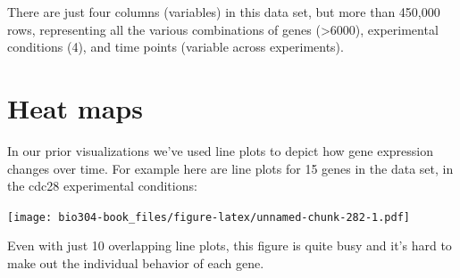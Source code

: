 \documentclass[]{book}
\newenvironment{Shaded}{\begin{snugshade}}{\end{snugshade}}
\newcommand{\DataTypeTok}[1]{\textcolor[rgb]{0.13,0.29,0.53}{#1}}
\newcommand{\KeywordTok}[1]{\textcolor[rgb]{0.13,0.29,0.53}{\textbf{#1}}}
\newcommand{\NormalTok}[1]{#1}
\newcommand{\OperatorTok}[1]{\textcolor[rgb]{0.81,0.36,0.00}{\textbf{#1}}}
\newcommand{\StringTok}[1]{\textcolor[rgb]{0.31,0.60,0.02}{#1}}
\theoremstyle{definition}
\theoremstyle{definition}
\theoremstyle{definition}
\theoremstyle{remark}
\begin{document}
There are just four columns (variables) in this data set, but more than
450,000 rows, representing all the various combinations of genes
(\textgreater{}6000), experimental conditions (4), and time points
(variable across experiments).

\hypertarget{heat-maps}{%
\section{Heat maps}\label{heat-maps}}

In our prior visualizations we've used line plots to depict how gene
expression changes over time. For example here are line plots for 15
genes in the data set, in the cdc28 experimental conditions:

\begin{Shaded}
\end{Shaded}

\texttt{[image: bio304-book\_files/figure-latex/unnamed-chunk-282-1.pdf]}

Even with just 10 overlapping line plots, this figure is quite busy and
it's hard to make out the individual behavior of each gene.
\end{document}
